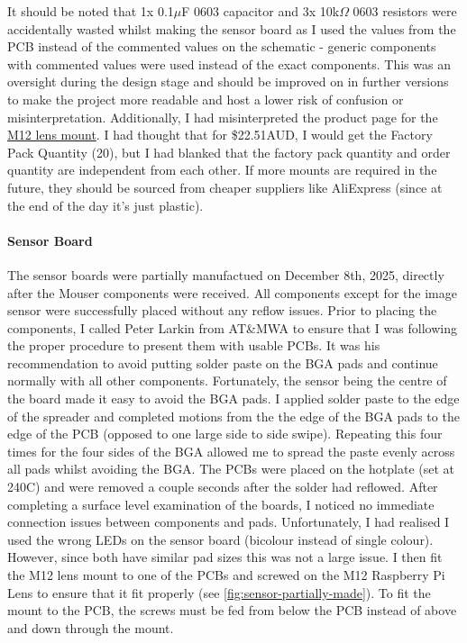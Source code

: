 It should be noted that 1x 0.1$\mu$F 0603 capacitor and 3x 10k$\Omega$ 0603 resistors were accidentally wasted whilst making the sensor board as I used the values from the PCB instead of the commented values on the schematic - generic components with commented values were used instead of the exact components.
This was an oversight during the design stage and should be improved on in further versions to make the project more readable and host a lower risk of confusion or misinterpretation.
\nl
Additionally, I had misinterpreted the product page for the \href{https://au.mouser.com/ProductDetail/Vision-Components/MIPI-LHLD12?qs=Znm5pLBrcAJI2%252BzumslyRA%3D%3D&srsltid=AfmBOoqr8Mm1qwy0BK2N0wo_CrXxpCy7PLH3sw8MPNLAsFLDGxInytsz}{M12 lens mount}.
I had thought that for \$22.51AUD, I would get the Factory Pack Quantity (20), but I had blanked that the factory pack quantity and order quantity are independent from each other. If more mounts are required in the future, they should be sourced from cheaper suppliers like AliExpress (since at the end of the day it's just plastic).


\paragraph{Sensor Board}
The sensor boards were partially manufactued on December 8th, 2025, directly after the Mouser components were received. All components except for the image sensor were successfully placed without any reflow issues.
\nl
Prior to placing the components, I called Peter Larkin from AT\&MWA to ensure that I was following the proper procedure to present them with usable PCBs. It was his recommendation to avoid putting solder paste on the BGA pads and continue normally with all other components.
Fortunately, the sensor being the centre of the board made it easy to avoid the BGA pads. I applied solder paste to the edge of the spreader and completed motions from the the edge of the BGA pads to the edge of the PCB (opposed to one large side to side swipe). Repeating this four times for the four sides of the BGA allowed me to spread the paste evenly across all pads whilst avoiding the BGA.
\nl
The PCBs were placed on the hotplate (set at 240C) and were removed a couple seconds after the solder had reflowed. After completing a surface level examination of the boards, I noticed no immediate connection issues between components and pads.
Unfortunately, I had realised I used the wrong LEDs on the sensor board (bicolour instead of single colour). However, since both have similar pad sizes this was not a large issue.
\nl
I then fit the M12 lens mount to one of the PCBs and screwed on the M12 Raspberry Pi Lens to ensure that it fit properly (see \autoref{fig:sensor-partially-made}). To fit the mount to the PCB, the screws must be fed from below the PCB instead of above and down through the mount.

